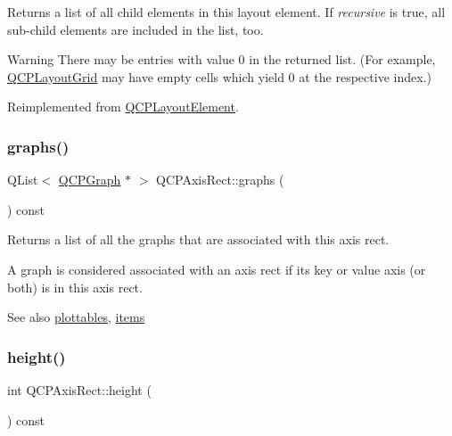 Returns a list of all child elements in this layout element. If {\itshape recursive} is true, all sub-\/child elements are included in the list, too.

\begin{DoxyWarning}{Warning}
There may be entries with value 0 in the returned list. (For example, \mbox{\hyperlink{class_q_c_p_layout_grid}{Q\+C\+P\+Layout\+Grid}} may have empty cells which yield 0 at the respective index.) 
\end{DoxyWarning}


Reimplemented from \mbox{\hyperlink{class_q_c_p_layout_element_a76dec8cb31e498994a944d7647a43309}{Q\+C\+P\+Layout\+Element}}.

\mbox{\label{class_q_c_p_axis_rect_a2d9ded3eca97be1fcb5867949391bb88}} 
\subsubsection{\texorpdfstring{graphs()}{graphs()}}
{\footnotesize\ttfamily Q\+List$<$ \mbox{\hyperlink{class_q_c_p_graph}{Q\+C\+P\+Graph}} $\ast$ $>$ Q\+C\+P\+Axis\+Rect\+::graphs (\begin{DoxyParamCaption}{ }\end{DoxyParamCaption}) const}

Returns a list of all the graphs that are associated with this axis rect.

A graph is considered associated with an axis rect if its key or value axis (or both) is in this axis rect.

\begin{DoxySeeAlso}{See also}
\mbox{\hyperlink{class_q_c_p_axis_rect_a587d073a97b27bc7293fab4b2774ad59}{plottables}}, \mbox{\hyperlink{class_q_c_p_axis_rect_a03c113a2175448300ee8f944e24776ba}{items}} 
\end{DoxySeeAlso}
\mbox{\label{class_q_c_p_axis_rect_acc4377809e79d9a089ab790f39429b0d}} 
\subsubsection{\texorpdfstring{height()}{height()}}
{\footnotesize\ttfamily int Q\+C\+P\+Axis\+Rect\+::height (\begin{DoxyParamCaption}{ }\end{DoxyParamCaption}) const\hspace{0.3cm}{\ttfamily [inline]}}


